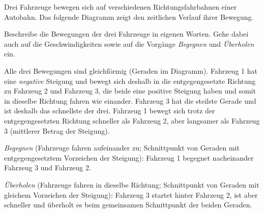 \begin{questions}
\begin{taskbox}
\question[4] Drei Fahrzeuge bewegen sich auf verschiedenen
Richtungsfahrbahnen einer Autobahn. Das folgende Diagramm zeigt den
zeitlichen Verlauf ihrer Bewegung.

\begin{center}
\end{center}

Beschreibe die Bewegungen der drei Fahrzeuge in eigenen Worten. Gehe dabei
auch auf die Geschwindigkeiten sowie auf die Vorgänge \emph{Begegnen} und
\emph{Überholen} ein.
\begin{solution}
Alle drei Bewegungen sind gleichförmig (Geraden im Diagramm). Fahrzeug 1
hat eine \emph{negative} Steigung und bewegt sich deshalb in die
entgegengesetzte Richtung zu Fahrzeug 2 und Fahrzeug 3, die beide eine
positive Steigung haben und somit in dieselbe Richtung fahren wie
einander. Fahrzeug 3 hat die steilste Gerade und ist deshalb das
schnellste der drei. Fahrzeug 1 bewegt sich trotz der entgegengesetzten
Richtung schneller als Fahrzeug 2, aber langsamer als Fahrzeug 3
(mittlerer Betrag der Steigung).

\emph{Begegnen} (Fahrzeuge fahren aufeinander zu; Schnittpunkt von Geraden
mit entgegengesetztem Vorzeichen der Steigung): Fahrzeug 1 begegnet
nacheinander Fahrzeug 3 und Fahrzeug 2.

\emph{Überholen} (Fahrzeuge fahren in dieselbe Richtung; Schnittpunkt von
Geraden mit gleichem Vorzeichen der Steigung): Fahrzeug 3 startet hinter
Fahrzeug 2, ist aber schneller und überholt es beim gemeinsamen
Schnittpunkt der beiden Geraden.
\end{solution}
\end{taskbox}
\end{questions}

